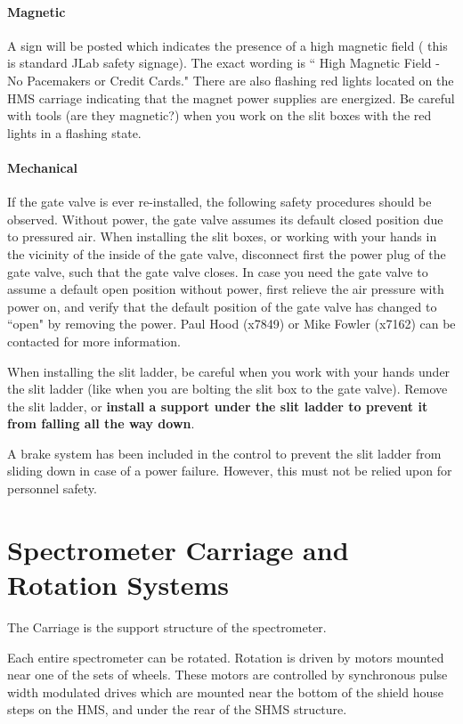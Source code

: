 {\paragraph{Magnetic}

A sign will be posted which indicates the presence of a high magnetic
field ( this is standard JLab safety signage). The exact wording is
`` High Magnetic Field - No Pacemakers or Credit Cards." There are also
flashing red lights located on the HMS carriage indicating that the
magnet power supplies are energized. Be careful with tools (are they magnetic?)
when you work on the slit boxes with the red lights in a flashing state.

\paragraph{Mechanical}

If the gate valve is ever re-installed, the following safety
procedures should be observed.  Without power, the gate valve assumes its default closed position due to
pressured air. When installing the slit boxes, or working with your hands
in the vicinity of the inside of the gate valve, disconnect first the power
plug of the gate valve, such that the gate valve closes.
In case you need the gate valve to assume a default open position without
power, first relieve the air pressure
with power on, and verify that the default position of the gate valve has
changed to ``open" by removing the power. Paul Hood (x7849) or Mike Fowler
(x7162) can be contacted for more information.

When installing the slit ladder, be careful when you work with your hands
under the slit ladder (like when you are bolting the slit box to the
gate valve). Remove the slit ladder, or {\bf install a support under the slit
ladder to prevent it from falling all the way down}.

A brake system has been included in the control to prevent the slit ladder
from sliding down in case of a power failure.  However, this must not
be relied upon for personnel safety.


\section{Spectrometer Carriage and Rotation Systems}

The Carriage is the support structure of the spectrometer.

Each entire spectrometer can be rotated. Rotation is driven by motors mounted
near one of the sets of wheels. These motors are controlled by synchronous 
pulse width modulated drives which are mounted near the bottom of the shield 
house steps on the HMS, and under the rear of the SHMS structure.

}
